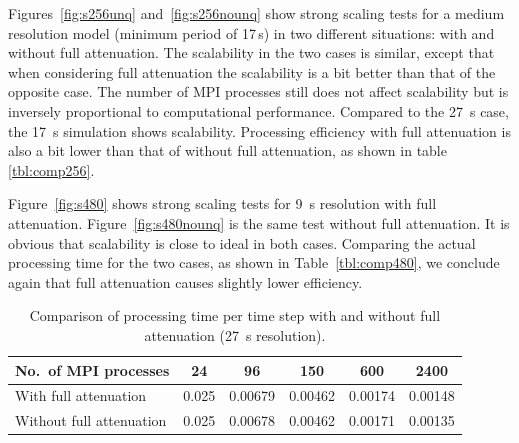 Figures~\ref{fig:s256unq} and~\ref{fig:s256nounq} show strong scaling tests
for a medium resolution model (minimum period of 17\,s)
in two different situations: with and without full attenuation. The
scalability in the two cases is similar, except that
when considering full attenuation the scalability is a bit better than that of the
opposite case. The number of MPI processes still does not affect scalability
 but is inversely proportional to computational performance.
Compared to the 27~s case, the
17~s simulation shows scalability. Processing efficiency with
full attenuation is also a bit lower than that of without full attenuation, as
shown in table \ref{tbl:comp256}.

Figure~\ref{fig:s480} shows strong scaling tests for 9~s resolution with
full attenuation. Figure~\ref{fig:s480nounq} is the same test without
full attenuation. It is obvious that scalability is close to ideal in
both cases. Comparing the actual processing time for the two cases, as shown in
Table~\ref{tbl:comp480}, we conclude again that full attenuation
causes slightly lower efficiency.

\begin{table}
\centering
  \caption[Processing time with and without full attenuation at 27~s resolution]
  {\small{Comparison of processing time per time step with and without full 
    attenuation (27~s resolution).}}
\label{tbl:comp160}
    \begin{tabular}{lccccc}
	  No.\ of MPI processes & 24 & 96 & 150 & 600   &  2400			       		 \\
    \midrule
	  With full attenuation & 0.025 & 0.00679 & 0.00462 & 0.00174 &0.00148 \\
    Without full attenuation & 0.025 & 0.00678 &0.00462 &0.00171 & 0.00135		       		 \\
    \end{tabular}
 \end{table}

